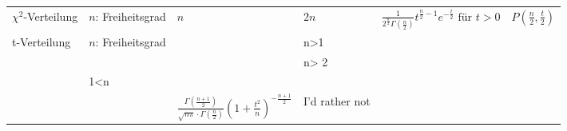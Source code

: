 \documentclass[a4paper,10pt]{article}
\begin{document}
\begin{center}
\begin{tabularx}{\textwidth}{llXXXX}
		\( \chi ^2 \)-Verteilung & \( n \): Freiheitsgrad               & \( n \)                          & \( 2n \)                         & \( \frac{1}{2^{\frac{n}{2}}\Gamma (\frac{n}{2})} t^{\frac{n}{2}-1} e^{-\frac{t}{2}} \text{ für } t>0\)                                        & \(P\left( \frac{n}{2}, \frac{t}{2}\right)  \) \\

		t-Verteilung             & \( n \): Freiheitsgrad               & \( \begin{cases} 0 & n>1 \\ \text{undef.} & \text{sonst} \end{cases} \) & \( \begin{cases} \frac{n}{n-2} & n> 2 \\ \infty & 1<n \leq 2 \\ \text{undef.} & \text{sonst} \end{cases} \) & \( \frac{\Gamma \left( \frac{n+1}{2} \right) }{\sqrt{n\pi } \cdot \Gamma (\frac{n}{2})} \left( 1+ \frac{t^2}{n} \right) ^{- \frac{n+1}{2}} \) & I'd rather not                                \\


		\bottomrule
	\end{tabularx}
\end{center}
\end{document}
